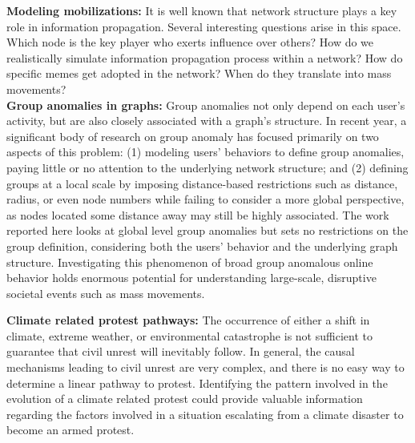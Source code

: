 \noindent
{\bf Modeling mobilizations:}
It is well known that network structure plays a key role in information propagation.
Several interesting questions arise in this space. Which node is the key player who exerts influence over others? How do we realistically simulate information propagation process within a network?
How do specific memes get adopted in the network? When do they translate into mass movements?\\

\noindent
{\bf Group anomalies in graphs:}
Group anomalies not only depend on each user's activity, but are also closely associated with a graph's structure. In recent year, a significant body of research on group anomaly has focused primarily on two aspects of this problem: (1) modeling users' behaviors to define group anomalies, paying little or no attention to the underlying network structure; and (2) defining groups at a local scale by imposing distance-based restrictions such as distance, radius, or even node numbers while failing to consider a more global perspective, as nodes located some distance away may still be highly associated. The work reported here looks at global level group anomalies but sets no restrictions on the group definition, considering both the users' behavior and the underlying graph structure. Investigating this phenomenon of broad group anomalous online behavior holds enormous potential for understanding large-scale, disruptive societal events such as mass movements.


\noindent
{\bf Climate related protest pathways:}
The occurrence of either a shift in climate, extreme weather, or environmental catastrophe is not sufficient to guarantee that civil unrest will inevitably follow. In general, the causal mechanisms leading to civil unrest are very complex, and there is no easy way to determine a linear pathway to protest. Identifying the pattern involved in the evolution of a climate related protest could provide valuable information regarding the factors involved in a situation escalating from a climate disaster to become an armed protest.


